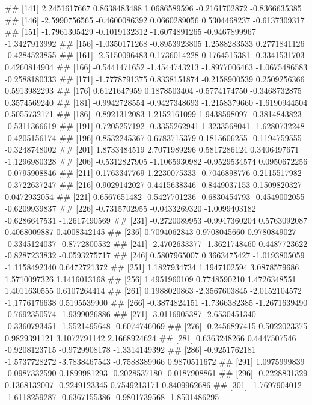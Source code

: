 \documentclass[
]{article}
\begin{document}
\begin{enumerate}[label=(\alph*)]
##  [141]  2.2451617667  0.8638483488  1.0686589596 -0.2161702872 -0.8366635385
##  [146] -2.5990756565 -0.4600086392  0.0660289056  0.5304468237 -0.6137309317
##  [151] -1.7961305429 -0.1019132312 -1.6074891265 -0.9467899967 -1.3427913992
##  [156] -1.0350171268 -0.8953923805  1.2588283533  0.2771841126 -0.4284523855
##  [161] -2.5150096483  0.1736014228  0.1764515381 -0.3341531703  0.4260814904
##  [166] -0.5441471652 -1.4544743213 -1.8977006463 -1.0675486583 -0.2588180333
##  [171] -1.7778791375  0.8338151874 -0.2158900539  0.2509256366  0.5913982293
##  [176]  0.6121647959  0.1878503404 -0.5774174750 -0.3468732875  0.3574569240
##  [181] -0.9942728554 -0.9427348693 -1.2158379660 -1.6190944504  0.5055732171
##  [186] -0.8921312083  1.2152161099  1.9438598097 -0.3814843823 -0.5311366619
##  [191]  0.7205257192 -0.3355262941  1.3233568041 -1.6280732248 -0.4205156174
##  [196]  0.8532245367  0.6783715379  0.1815606255 -0.1194759555 -0.3248748002
##  [201]  1.8733484519  2.7071989296  0.5817286124  0.3406497671 -1.1296980328
##  [206] -0.5312827905 -1.1065930982 -0.9529534574  0.0950672256 -0.0795908846
##  [211]  0.1763347769  1.2230075333 -0.7046898776  0.2115517982 -0.3722637247
##  [216]  0.9029142027  0.4415638346 -0.8449037153  0.1509820327  0.0472932054
##  [221]  0.6567651482 -0.5427701236 -0.6830454793 -0.4549002055 -0.6209939837
##  [226] -0.7315702955 -0.0433269320 -1.0099403182 -0.6286647531 -1.2617490569
##  [231] -0.2720089953 -0.9947360204  0.5763092087  0.4068009887  0.4008342145
##  [236]  0.7094062843  0.9708045660  0.9780849027 -0.3345124037 -0.8772800532
##  [241] -2.4702633377 -1.3621748460  0.4487723622 -0.8287233832 -0.0593275717
##  [246]  0.5807965007  0.3663475427 -1.0193805059 -1.1158492340  0.6472721372
##  [251]  1.1827934734  1.1947102594  3.0878579686  1.5710097326  1.1416013168
##  [256]  1.4951960109  0.7748590210  1.4726348551  1.4011630555  0.6107264414
##  [261]  0.1988020863 -2.3567603845 -2.0152104572 -1.1776176638  0.5195539900
##  [266] -0.3874824151 -1.7366382385 -1.2671639490 -0.7692350574 -1.9399026886
##  [271] -3.0116905387 -2.6530451340 -0.3360793451 -1.5521495648 -0.6074746069
##  [276] -0.2456897415  0.5022023375  0.9829391121  3.1072791142  2.1668924624
##  [281]  0.6363248266  0.4447507546 -0.9208123715 -0.9729908178 -1.3314149392
##  [286] -0.9251762181 -1.5737728272 -3.7838467543 -0.7588389966  0.9870511672
##  [291]  1.0975999839 -0.0987332590  0.1899981293 -0.2028537180 -0.0187908861
##  [296] -0.2228831329  0.1368132007 -0.2249123345  0.7549213171  0.8409962686
##  [301] -1.7697904012 -1.6118259287 -0.6367155386 -0.9801739568 -1.8501486295

\end{enumerate}
\end{document}
